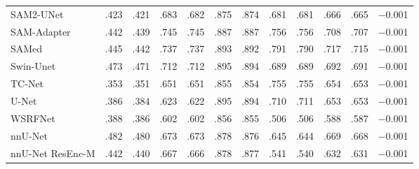 \begin{landscape}
{\begin{longtable}{l c c c c c c c c c c c}
SAM2-UNet & .423 & .421 & .683 & .682 & .875 & .874 & .681 & .681 & .666 & .665 & $-$0.001 \\
SAM-Adapter & .442 & .439 & .745 & .745 & .887 & .887 & .756 & .756 & .708 & .707 & $-$0.001 \\
SAMed & .445 & .442 & .737 & .737 & .893 & .892 & .791 & .790 & .717 & .715 & $-$0.001 \\
Swin-Unet & .473 & .471 & .712 & .712 & .895 & .894 & .689 & .689 & .692 & .691 & $-$0.001 \\
TC-Net & .353 & .351 & .651 & .651 & .855 & .854 & .755 & .755 & .654 & .653 & $-$0.001 \\
U-Net & .386 & .384 & .623 & .622 & .895 & .894 & .710 & .711 & .653 & .653 & $-$0.001 \\
WSRFNet & .388 & .386 & .602 & .602 & .856 & .855 & .506 & .506 & .588 & .587 & $-$0.001 \\
nnU-Net & .482 & .480 & .673 & .673 & .878 & .876 & .645 & .644 & .669 & .668 & $-$0.001 \\
nnU-Net ResEnc-M & .442 & .440 & .667 & .666 & .878 & .877 & .541 & .540 & .632 & .631 & $-$0.001 \\
\end{longtable}
}
\vspace{-6pt}
\end{landscape}